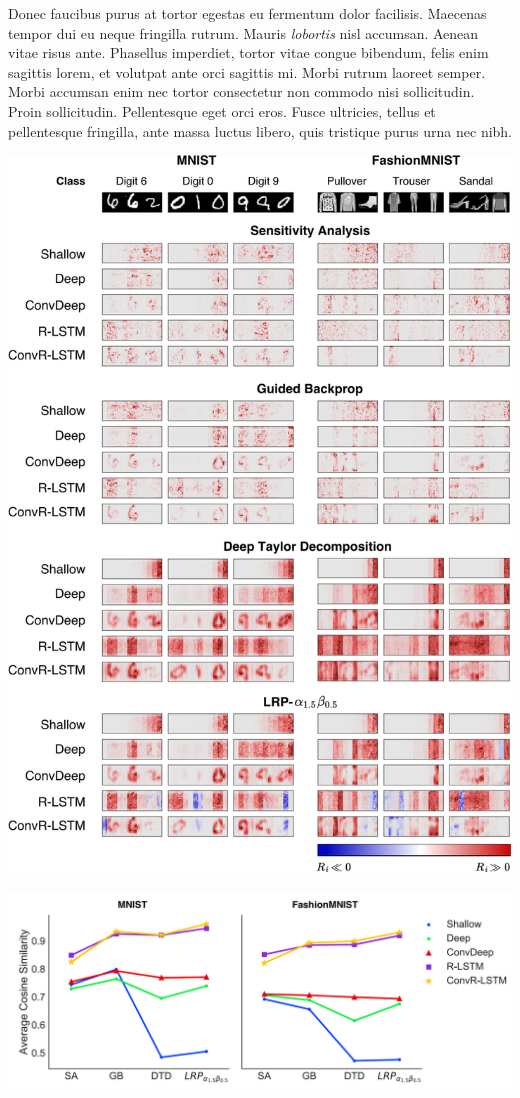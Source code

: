 \documentclass[a0,portrait]{a0poster}
\begin{document}
\begin{multicols}{2}
Donec faucibus purus at tortor egestas eu fermentum dolor facilisis. Maecenas tempor dui eu neque fringilla rutrum. Mauris \emph{lobortis} nisl accumsan. Aenean vitae risus ante.
Phasellus imperdiet, tortor vitae congue bibendum, felis enim sagittis lorem, et volutpat ante orci sagittis mi. Morbi rutrum laoreet semper. Morbi accumsan enim nec tortor consectetur non commodo nisi sollicitudin. Proin sollicitudin. Pellentesque eget orci eros. Fusce ultricies, tellus et pellentesque fringilla, ante massa luctus libero, quis tristique purus urna nec nibh.

\begin{center}\vspace{0.5cm}
\includegraphics[width=0.8\linewidth]{heatmap_msc_poster}
\end{center}\vspace{0.5cm}

\begin{center}\vspace{0.5cm}
\includegraphics[width=0.7\linewidth]{rel_dist_maj_for_poster}
\end{center}\vspace{0.5cm}



\end{multicols}
\end{document}
